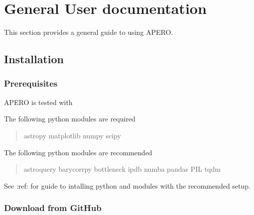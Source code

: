 \documentclass[a4paper,10pt,english]{report}
\begin{document}
\chapter{General User documentation}
\label{\detokenize{user/general_guide:general-user-documentation}}\label{\detokenize{user/general_guide:general-guide}}\label{\detokenize{user/general_guide::doc}}
This section provides a general guide to using APERO.


\section{Installation}
\label{\detokenize{user/general/installation:installation}}\label{\detokenize{user/general/installation:id1}}\label{\detokenize{user/general/installation::doc}}

\subsection{Prerequisites}
\label{\detokenize{user/general/installation:prerequisites}}\label{\detokenize{user/general/installation:installation-prerequisites}}
APERO is tested with 

The following python modules are required
\begin{quote}

\begin{sphinxVerbatim}[commandchars=\\\{\}]
astropy
matplotlib
numpy
scipy
\end{sphinxVerbatim}
\end{quote}

The following python modules are recommended
\begin{quote}

\begin{sphinxVerbatim}[commandchars=\\\{\}]
astroquery
barycorrpy
bottleneck
ipdb
numba
pandas
PIL
tqdm
\end{sphinxVerbatim}
\end{quote}

See :ref:  for guide to intalling python and modules with
the recommended setup.


\subsection{Download from GitHub}
\label{\detokenize{user/general/installation:download-from-github}}\label{\detokenize{user/general/installation:installation-download}}
\end{document}
